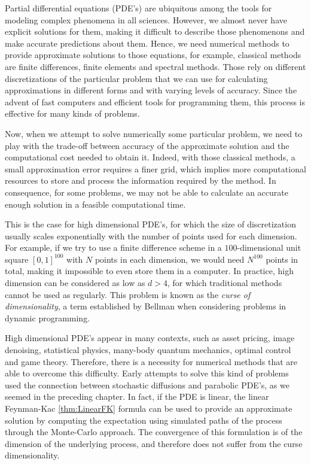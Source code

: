 Partial differential equations (PDE's) are ubiquitous among the tools for modeling complex phenomena in all sciences. However, we almost never have explicit solutions for them, making it difficult to describe those phenomenons and make accurate predictions about them. Hence, we need numerical methods to provide approximate solutions to those equations, for example, classical methods are finite differences, finite elements and spectral methods. Those rely on different discretizations of the particular problem that  we can use for calculating approximations in different forms and with varying levels of accuracy. Since the advent of fast computers and efficient tools for programming them, this process is effective for many kinds of problems.   

Now, when we attempt to solve numerically some particular problem, we need to play with the trade-off between accuracy of the approximate solution and the computational cost needed to obtain it. Indeed, with those classical methods, a small approximation error requires a finer grid, which implies more computational resources to store and process the information required by the method. In consequence, for some problems, we may not be able to calculate an accurate enough solution in a feasible computational time.

This is the case for high dimensional PDE's, for which the size of discretization usually scales exponentially with the number of points used for each dimension. For example, if we try to use a finite difference scheme in a $100$-dimensional unit square $[0,1]^{100}$ with $N$ points in each dimension, we would need $N^{100}$ points in total, making it impossible to even store them in a computer. In practice, high dimension can be considered as low as $d>4$, for which traditional methods cannot be used as regularly. This problem is known as the \textit{curse of dimensionality}, a term established by Bellman when considering problems in dynamic programming.

High dimensional PDE's appear in many contexts, such as asset pricing, image denoising, statistical physics, many-body quantum mechanics, optimal control and game theory. Therefore, there is a necessity for numerical methods that are able to overcome this difficulty. Early attempts to solve this kind of problems used the connection between stochastic diffusions and parabolic PDE's, as we seemed in the preceding chapter. In fact, if the PDE is linear, the linear Feynman-Kac \ref{thm:LinearFK} formula can be used to provide an approximate solution by computing the expectation using simulated paths of the process through the  Monte-Carlo approach. The convergence of this formulation is  of the dimension of the underlying process, and therefore does not suffer from the curse dimensionality.

